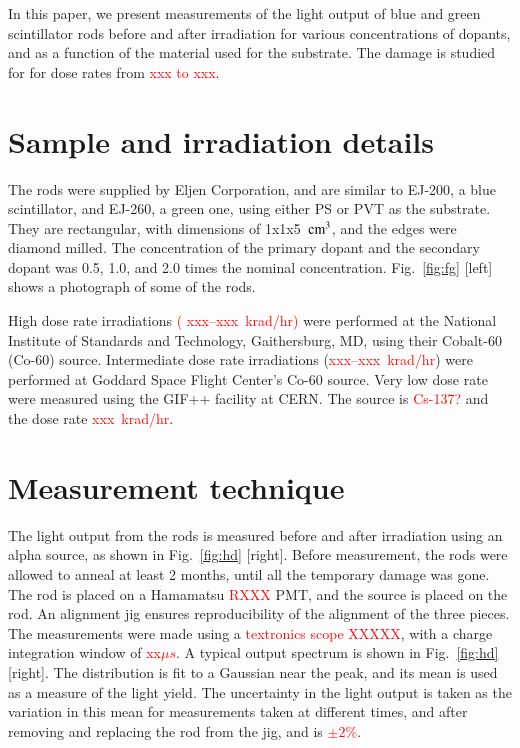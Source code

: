 \documentclass[review]{elsarticle}
\begin{document}
In this paper, we present measurements of the light output 
of blue and green scintillator rods 
before and after irradiation for various concentrations of dopants, and
as a function of the material used for the substrate.
The damage is studied for 
for dose rates from \textcolor{red}{xxx to xxx}.


\section{Sample and irradiation details}
The rods were supplied by Eljen Corporation, and
are similar to EJ-200, a blue scintillator, and EJ-260, a green one, using either
PS or PVT as the substrate.
They are rectangular, with dimensions of 1x1x5~$\rm{cm^3}$, 
and the edges were diamond milled.
The concentration of the primary dopant and the secondary dopant
was 0.5, 1.0, and 2.0 times the nominal concentration.
Fig.~\ref{fig:fg} [left] shows a photograph of some of the rods.

High dose rate irradiations \textcolor{red}{( xxx--xxx~krad/hr)}
were performed at the National Institute of Standards and Technology, Gaithersburg, MD, using their Cobalt-60 (Co-60) source.  Intermediate dose rate irradiations (\textcolor{red}{xxx--xxx~krad/hr}) were performed at Goddard Space Flight Center's Co-60 source.  Very low dose rate were measured using the GIF++ facility\cite{gif} at CERN.  The source is \textcolor{red}{Cs-137?} and the dose rate \textcolor{red}{xxx~krad/hr}.

\section{Measurement technique}
The light output from the rods is measured before and after
irradiation using an alpha source, as shown in Fig.~\ref{fig:hd} [right].
Before measurement, the rods were allowed to anneal
at least 2 months,  until all the temporary damage was gone.
The rod is placed on a Hamamatsu \textcolor{red}{RXXX} PMT, and the
source is placed on the rod.  An alignment jig ensures reproducibility
of the alignment of the three pieces.  The measurements were made using
a \textcolor{red}{textronics scope XXXXX}, with a charge integration
window of \textcolor{red}{xx$\mu s$}.
A typical output spectrum is shown in Fig.~\ref{fig:hd} [right].
The distribution is fit to a Gaussian near the peak, and its mean is used as a measure of the light yield.  The uncertainty in the light output is taken as the variation in this mean for measurements taken at different times, and after removing and replacing the rod from the jig, and is
\textcolor{red}{$\pm 2$\%}.
\end{document}
